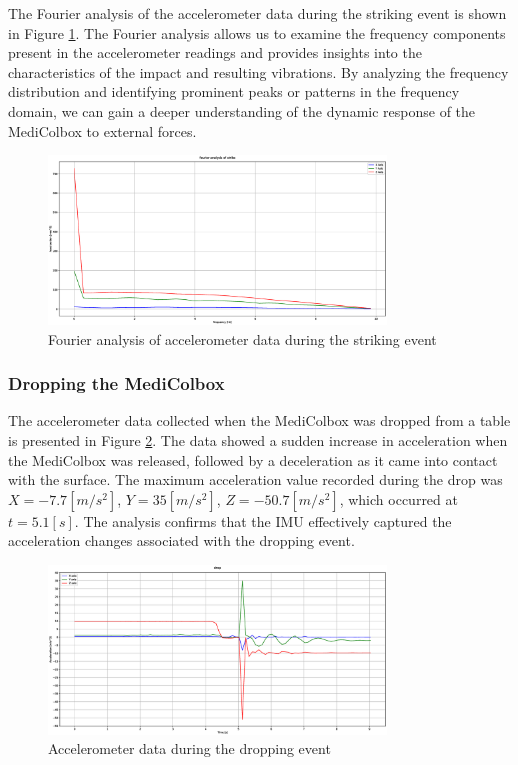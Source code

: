 \documentclass[../main.tex]{subfiles}
\begin{document}
The Fourier analysis of the accelerometer data during the
striking event is shown in
Figure \ref{fig:fourier_accelerometer_striking}.
The Fourier analysis allows us to examine the
frequency components present in the accelerometer readings and
provides insights into the characteristics of the
impact and resulting vibrations.
By analyzing the frequency distribution and
identifying prominent peaks or patterns in the frequency domain,
we can gain a deeper understanding of the
dynamic response of the MediColbox to external forces.

\begin{figure}[htbp]
    \centering
    \includegraphics[width=0.8\textwidth]{resources/figures/Fourier_acceleration_strike.eps}
    \caption{Fourier analysis of accelerometer data during the striking event}
    \label{fig:fourier_accelerometer_striking}
\end{figure}

\clearpage
\subsubsection{Dropping the MediColbox}

The accelerometer data collected when the MediColbox was
dropped from a table is presented in
Figure \ref{fig:accelerometer_dropping}.
The data showed a sudden increase in acceleration when the
MediColbox was released,
followed by a deceleration as it came into contact with the
surface. The maximum acceleration value recorded during the
drop was
$X = -7.7 [m/s^2]$, $Y = 35 [m/s^2]$, $Z = -50.7 [m/s^2]$,
which occurred at $t = 5.1[s]$.
The analysis confirms that the IMU effectively captured the
acceleration changes associated with the dropping event.

\begin{figure}[htbp]
    \centering
    \includegraphics[width=0.8\textwidth]{resources/figures/Acceleration_drop.eps}
    \caption{Accelerometer data during the dropping event}
    \label{fig:accelerometer_dropping}
\end{figure}
\end{document}
